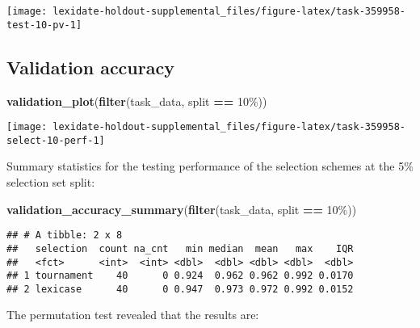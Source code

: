 \documentclass[
]{book}
\newenvironment{Shaded}{\begin{snugshade}}{\end{snugshade}}
\newcommand{\FunctionTok}[1]{\textcolor[rgb]{0.13,0.29,0.53}{\textbf{#1}}}
\newcommand{\NormalTok}[1]{#1}
\newcommand{\SpecialCharTok}[1]{\textcolor[rgb]{0.81,0.36,0.00}{\textbf{#1}}}
\newcommand{\StringTok}[1]{\textcolor[rgb]{0.31,0.60,0.02}{#1}}
\begin{document}
\texttt{[image: lexidate-holdout-supplemental\_files/figure-latex/task-359958-test-10-pv-1]}

\hypertarget{validation-accuracy-31}{%
\subsection{Validation accuracy}\label{validation-accuracy-31}}

\begin{Shaded}
\begin{Highlighting}[]
\FunctionTok{validation\_plot}\NormalTok{(}\FunctionTok{filter}\NormalTok{(task\_data, split }\SpecialCharTok{==} \StringTok{\textquotesingle{}10\%\textquotesingle{}}\NormalTok{))}
\end{Highlighting}
\end{Shaded}

\texttt{[image: lexidate-holdout-supplemental\_files/figure-latex/task-359958-select-10-perf-1]}

Summary statistics for the testing performance of the selection schemes at the 5\% selection set split:

\begin{Shaded}
\begin{Highlighting}[]
\FunctionTok{validation\_accuracy\_summary}\NormalTok{(}\FunctionTok{filter}\NormalTok{(task\_data, split }\SpecialCharTok{==} \StringTok{\textquotesingle{}10\%\textquotesingle{}}\NormalTok{))}
\end{Highlighting}
\end{Shaded}

\begin{verbatim}
## # A tibble: 2 x 8
##   selection  count na_cnt   min median  mean   max    IQR
##   <fct>      <int>  <int> <dbl>  <dbl> <dbl> <dbl>  <dbl>
## 1 tournament    40      0 0.924  0.962 0.962 0.992 0.0170
## 2 lexicase      40      0 0.947  0.973 0.972 0.992 0.0152
\end{verbatim}

The permutation test revealed that the results are:
\end{document}
